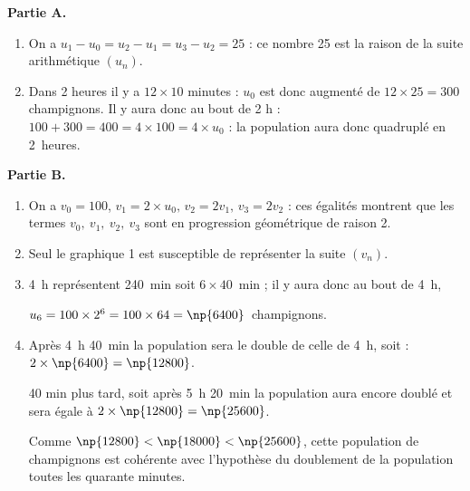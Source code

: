 \medskip

\textbf{Partie A.}

\medskip

\begin{enumerate}
\item On a $u_1 - u_0 = u_2 - u_1 = u_3 - u_2 = 25$ : ce nombre 25 est la raison de la suite arithmétique $(u_n)$.
\item Dans 2 heures il y a $12 \times 10$ minutes : $u_0$ est donc augmenté de $12 \times 25 = 300$ champignons. Il y aura donc au bout de 2 h : $100 + 300 = 400 = 4\times 100 = 4 \times u_0$ : la population aura donc quadruplé en 2~heures.
\end{enumerate}

\medskip

\textbf{Partie B.}

\medskip

\begin{enumerate}
\item On a $v_0 = 100$, $v_1 = 2 \times u_0, \, v_2 = 2v_1, \, v_3 = 2v_2$ : ces égalités montrent que les termes $v_0,\: v_1,\: v_2,\: v_3$ sont en progression géométrique de raison 2.
\item Seul le graphique 1 est susceptible de représenter la suite $(v_n)$.
\item 4~h représentent 240~min soit $6 \times 40$~min ; il y aura donc au bout de 4~h,

$u_6 = 100 \times 2^6 = 100 \times 64 = \np{6400}$~champignons.
\item Après 4~h 40~min la population sera le double de celle de 4~h, soit : $2 \times  \np{6400} = \np{12800}$.

40 min plus tard, soit après 5~h 20~min la population aura encore doublé et sera égale à $2 \times \np{12800} = \np{25600}$.

Comme $\np{12800} < \np{18000} < \np{25600}$, cette population de  champignons est cohérente avec l'hypothèse du doublement de la population toutes les quarante minutes.
\end{enumerate}

\bigskip
